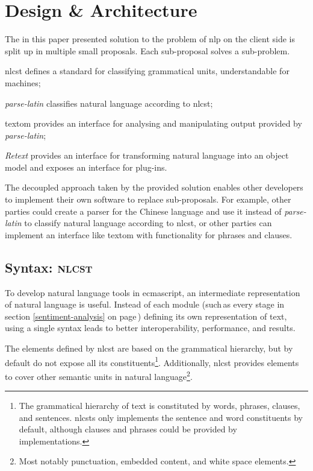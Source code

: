 \chapter{Design \& Architecture}\label{design}

The in this paper presented solution to the problem of \gls{nlp} on the
  client side is split up in multiple small proposals.
Each sub-proposal solves a sub-problem.

\begin{aenumerate}
\item\acrshort{nlcst} defines a standard for classifying grammatical units,
  understandable for machines;
\item\emph{parse-latin} classifies natural language according to
  \acrshort{nlcst};
\item\gls{textom} provides an interface for analysing and manipulating output
  provided by \emph{parse-latin};
\item\emph{Retext} provides an interface for transforming natural language
  into an object model and exposes an interface for plug-ins.
\end{aenumerate}

\noindent The decoupled approach taken by the provided solution enables other
  developers to implement their own software to replace sub-proposals.
For example, other parties could create a parser for the Chinese language and
  use it instead of \emph{parse-latin} to classify natural language according
  to \gls{nlcst}, or other parties can implement an interface like
  \gls{textom} with functionality for phrases and clauses.

\section{Syntax: \textsc{nlcst}}\label{syntax}

To develop natural language tools in \gls{ecmascript}, an intermediate
  representation of natural language is useful.
Instead of each module (such\,as every stage in section
  \ref{sentiment-analysis} on page\,\pageref{sentiment-analysis})
  defining its own representation of text, using a single syntax leads to
  better interoperability, performance, and results.

The elements defined by \acrfull{nlcst} are based on the grammatical
  hierarchy, but by default do not expose all its constituents\footnote{The
      grammatical hierarchy of text is constituted by words, phrases,
      clauses, and sentences.
    \glspl{nlcst} only implements the sentence and word constituents
    by default, although clauses and phrases could be provided by
    implementations.}.
Additionally, \gls{nlcst} provides elements to cover other semantic units in
  natural language\footnote{Most
    notably punctuation, embedded content, and white space elements.}.

